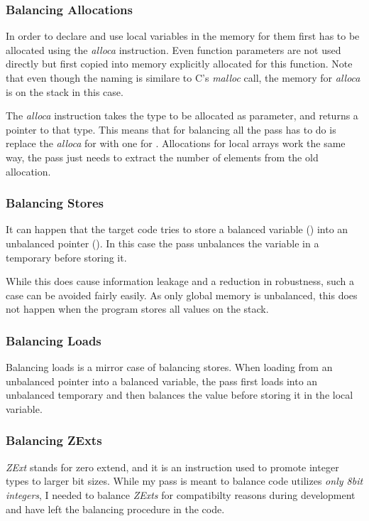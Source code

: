 \subsubsection{Balancing Allocations}
In order to declare and use local variables in \ir{} the memory for them first has to be allocated using the \emph{alloca} instruction.
Even function parameters are not used directly but first copied into memory explicitly allocated for this function.
Note that even though the naming is similare to C's \emph{malloc} call, the memory for \emph{alloca} is on the stack in this case.

The \emph{alloca} instruction takes the type to be allocated as parameter, and returns a pointer to that type.
This means that for balancing all the pass has to do is replace the \emph{alloca} for  with one for .
Allocations for local arrays work the same way, the pass just needs to extract the number of elements from the old allocation.

\subsubsection{Balancing Stores}
It can happen that the target code tries to store a balanced variable () into an unbalanced pointer ().
In this case the pass unbalances the variable in a temporary before storing it.

While this does cause information leakage and a reduction in robustness, such a case can be avoided fairly easily.
As only global memory is unbalanced, this does not happen when the program stores all values on the stack.

\subsubsection{Balancing Loads}
Balancing loads is a mirror case of balancing stores.
When loading from an unbalanced pointer into a balanced variable, the pass first loads into an unbalanced temporary and then balances the value before storing it in the local variable.

\subsubsection{Balancing ZExts}
\emph{ZExt} stands for zero extend, and it is an instruction used to promote integer types to larger bit sizes.
While my pass is meant to balance code utilizes \emph{only 8bit integers}, I needed to balance \emph{ZExts} for compatibilty reasons during development and have left the balancing procedure in the code.

